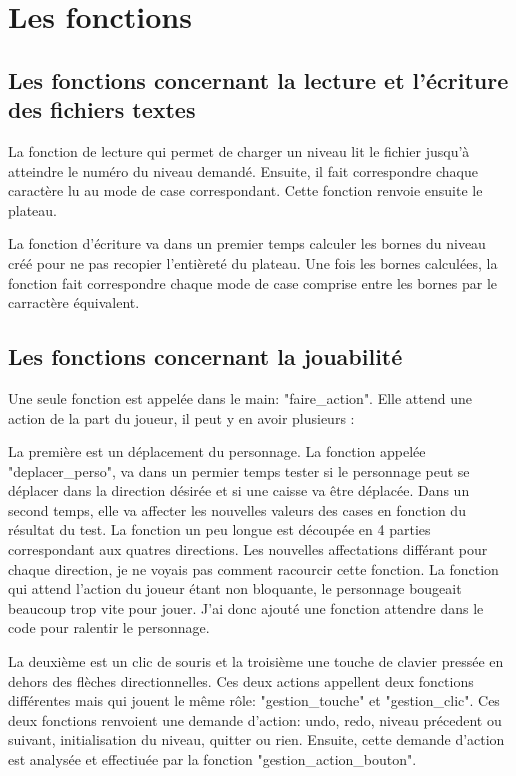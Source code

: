 \documentclass{report}
\begin{document}
	\chapter{Les fonctions}
		\section{Les fonctions concernant la lecture et l'écriture des fichiers textes}
La fonction de lecture qui permet de charger un niveau lit le fichier jusqu'à atteindre le numéro du niveau demandé. Ensuite, il fait correspondre chaque caractère lu au mode de case correspondant. Cette fonction renvoie ensuite le plateau.


La fonction d'écriture va dans un premier temps calculer les bornes du niveau créé pour ne pas recopier l'entièreté du plateau. Une fois les bornes calculées, la fonction fait correspondre chaque mode de case comprise entre les bornes par le carractère équivalent. 

		\section{Les fonctions concernant la jouabilité}
Une seule fonction est appelée dans le main: "faire\_action". Elle attend une action de la part du joueur, il peut y en avoir plusieurs :


La première est un déplacement du personnage. La fonction appelée "deplacer\_perso", va dans un permier temps tester si le personnage peut se déplacer dans la direction désirée et si une caisse va être déplacée.
Dans un second temps, elle va affecter les nouvelles valeurs des cases en fonction du résultat du test. La fonction un peu longue est découpée en 4 parties correspondant aux quatres directions.
Les nouvelles affectations différant pour chaque direction, je ne voyais pas comment racourcir cette fonction.
La fonction qui attend l'action du joueur étant non bloquante, le personnage bougeait beaucoup trop vite pour jouer. J'ai donc ajouté une fonction attendre dans le code pour ralentir le personnage.


La deuxième est un clic de souris et la troisième une touche de clavier pressée en dehors des flèches directionnelles. Ces deux actions appellent deux fonctions différentes mais qui jouent le même rôle: "gestion\_touche" et "gestion\_clic". Ces deux fonctions renvoient une demande d'action: undo, redo, niveau précedent ou suivant, initialisation du niveau, quitter ou rien.
Ensuite, cette demande d'action est analysée et effectiuée par la fonction "gestion\_action\_bouton".
	
\end{document}
